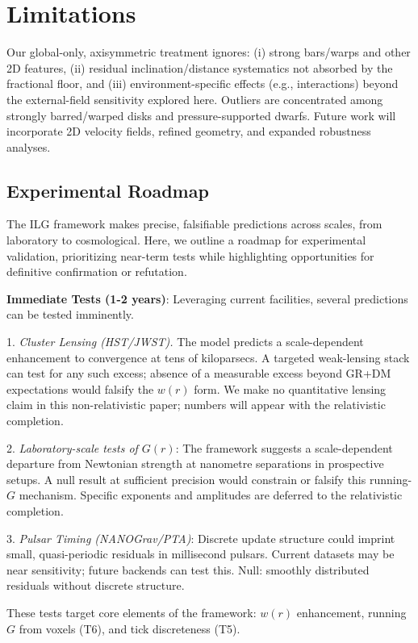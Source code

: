 \documentclass[usenatbib]{mnras}
\begin{document}
\section{Limitations}
\noindent Our global-only, axisymmetric treatment ignores: (i) strong bars/warps and other 2D features, (ii) residual inclination/distance systematics not absorbed by the fractional floor, and (iii) environment-specific effects (e.g., interactions) beyond the external-field sensitivity explored here. Outliers are concentrated among strongly barred/warped disks and pressure-supported dwarfs. Future work will incorporate 2D velocity fields, refined geometry, and expanded robustness analyses.

\subsection{Experimental Roadmap}

The ILG framework makes precise, falsifiable predictions across scales, from laboratory to cosmological. Here, we outline a roadmap for experimental validation, prioritizing near-term tests while highlighting opportunities for definitive confirmation or refutation.

\textbf{Immediate Tests (1-2 years)}: Leveraging current facilities, several predictions can be tested imminently.

1. \emph{Cluster Lensing (HST/JWST).} The model predicts a scale-dependent enhancement to convergence at tens of kiloparsecs. A targeted weak-lensing stack can test for any such excess; absence of a measurable excess beyond GR+DM expectations would falsify the $w(r)$ form. We make no quantitative lensing claim in this non-relativistic paper; numbers will appear with the relativistic completion.

2. \emph{Laboratory-scale tests of $G(r)$}: The framework suggests a scale-dependent departure from Newtonian strength at nanometre separations in prospective setups. A null result at sufficient precision would constrain or falsify this running-$G$ mechanism. Specific exponents and amplitudes are deferred to the relativistic completion.

3. \emph{Pulsar Timing (NANOGrav/PTA)}: Discrete update structure could imprint small, quasi-periodic residuals in millisecond pulsars. Current datasets may be near sensitivity; future backends can test this. Null: smoothly distributed residuals without discrete structure.

These tests target core elements of the framework: $w(r)$ enhancement, running $G$ from voxels (T6), and tick discreteness (T5).
\end{document}
